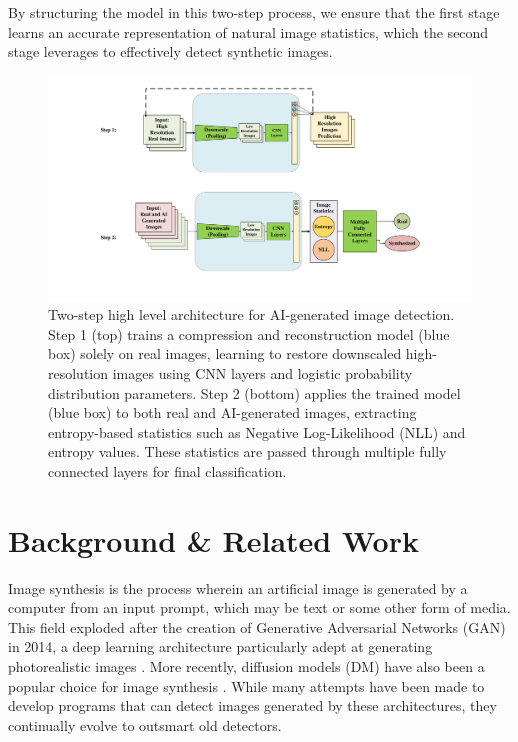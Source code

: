 \documentclass{article} %
\begin{document}
By structuring the model in this two-step process, we ensure that the first stage learns an accurate representation of natural image statistics, which the second stage leverages to effectively detect synthetic images.

\begin{figure}[htbp]
    \centering
    \includegraphics[width=\linewidth]{Fig/high_level_architecture.pdf}
    \caption{Two-step high level architecture for AI-generated image detection. Step 1 (top) trains a compression and reconstruction model (blue box) solely on real images, learning to restore downscaled high-resolution images using CNN layers and logistic probability distribution parameters. Step 2 (bottom) applies the trained model (blue box) to both real and AI-generated images, extracting entropy-based statistics such as Negative Log-Likelihood (NLL) and entropy values. These statistics are passed through multiple fully connected layers for final classification.}
\end{figure}

\section{Background \& Related Work}
\label{background}

Image synthesis is the process wherein an artificial image is generated by a computer from an input prompt, which may be text or some other form of media. This field exploded after the creation of Generative Adversarial Networks (GAN) in 2014, a deep learning architecture particularly adept at generating photorealistic images \citep{GANfather}. More recently, diffusion models (DM) have also been a popular choice for image synthesis \citep{latent-diffusion}. While many attempts have been made to develop programs that can detect images generated by these architectures, they continually evolve to outsmart old detectors.
\end{document}
